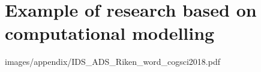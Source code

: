 \chapter{Example of research based on computational modelling}
\label{A-appendix}

{images/appendix/IDS_ADS_Riken_word_cogsci2018.pdf}


